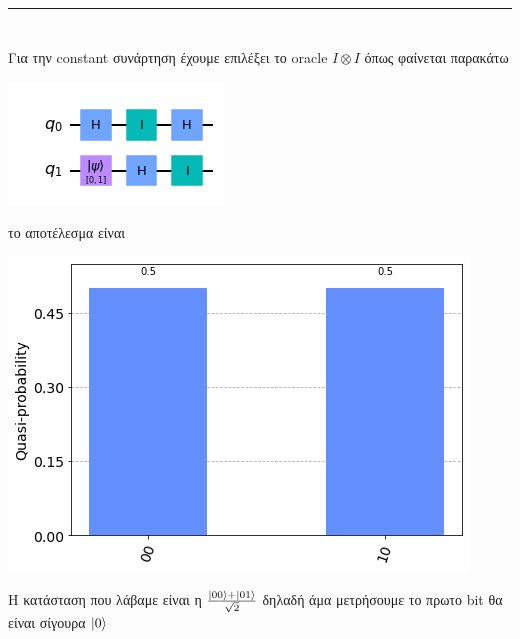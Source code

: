 \documentclass[12pt]{article}
\begin{document}
\rule{\textwidth}{.5pt}


\section*{{}} 

Για την \textlatin{constant} συνάρτηση έχουμε επιλέξει το \textlatin{oracle} $I \otimes I$ όπως φαίνεται παρακάτω
\begin{center}
    \includegraphics[]{constantoracle.png}
    \end{center}
το αποτέλεσμα είναι
\begin{center}
    \includegraphics[]{firsthisto.png}
\end{center}
H κατάσταση που λάβαμε είναι η $\frac{\ket{00}+\ket{01}}{\sqrt{2}}$  δηλαδή άμα μετρήσουμε το πρωτο \textlatin{bit} θα είναι σίγουρα $\ket{0}$\\
\end{document}
